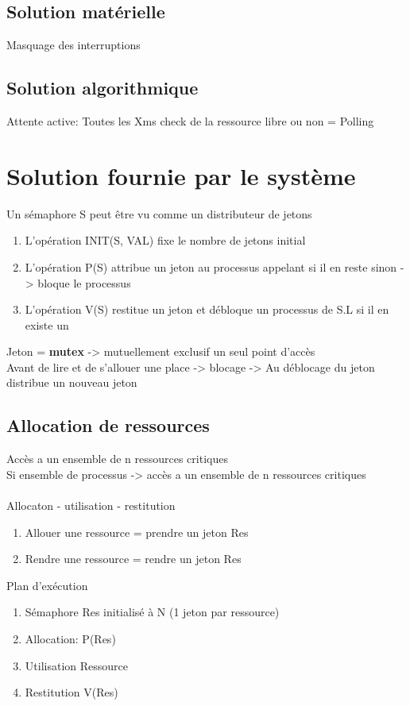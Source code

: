 \subsection{Solution matérielle}
Masquage des interruptions

\subsection{Solution algorithmique}
Attente active: Toutes les Xms check de la ressource libre ou non = Polling\\

\section{Solution fournie par le système}
Un sémaphore S peut être vu comme un distributeur de jetons\\
\begin{enumerate}
\item L'opération INIT(S, VAL) fixe le nombre de jetons initial
\item L'opération P(S) attribue un jeton au processus appelant si il en reste sinon -> bloque le processus
\item L'opération V(S) restitue un jeton et débloque un processus de S.L si il en existe un
\end{enumerate}
Jeton = \textbf{mutex} -> mutuellement exclusif un seul point d'accès\\
Avant de lire et de s'allouer une place -> blocage -> Au déblocage du jeton distribue un nouveau jeton

\subsection{Allocation de ressources}
Accès a un ensemble de n ressources critiques\\
Si ensemble de processus -> accès a un ensemble de n ressources critiques\\\\
Allocaton - utilisation - restitution
\begin{enumerate}
\item Allouer une ressource = prendre un jeton Res
\item Rendre une ressource = rendre un jeton Res
\end{enumerate}
Plan d'exécution
\begin{enumerate}
\item Sémaphore Res initialisé à N (1 jeton par ressource)
\item Allocation: P(Res)
\item Utilisation Ressource
\item Restitution V(Res)
\end{enumerate}

